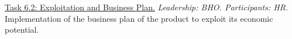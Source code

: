 \begin{table}[H]
\begin{tabular}
{{		\underline{Task 6.2: Exploitation and Business Plan.} \textit{Leadership: BHO. Participants: HR}. Implementation of the business plan of the product to exploit its economic potential.\\
		
		 }}\\
		 \hline 
		 
		 \\
		 
		 \hline 
		 
		\end{tabular}
		
		\caption{WP6 description}
		
\end{table}




